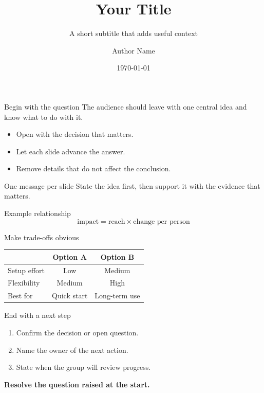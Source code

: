 \documentclass[aspectratio=169,12pt]{beamer}
\title{Your Title}
\subtitle{A short subtitle that adds useful context}
\author{Author Name}
\institute{Organization}
\date{\today}
\begin{document}
\begin{frame}[plain]
  \titlepage
\end{frame}

\begin{frame}[t]{Begin with the question}
  The audience should leave with one central idea and know what to do with it.

  \vspace{3mm}
  \begin{itemize}
    \item Open with the decision that matters.
    \item Let each slide advance the answer.
    \item Remove details that do not affect the conclusion.
  \end{itemize}
\end{frame}

\begin{frame}[t]{One message per slide}
  State the idea first, then support it with the evidence that matters.

  \vspace{4mm}
  \begin{block}{Example relationship}
    \[
      \text{impact} = \text{reach} \times \text{change per person}
    \]
  \end{block}
\end{frame}

\begin{frame}[t]{Make trade-offs obvious}
  \begin{table}
    \centering
    \begin{tabular}{@{}lcc@{}}
      \toprule
      & Option A & Option B \\
      \midrule
      Setup effort & Low & Medium \\
      Flexibility & Medium & High \\
      Best for & Quick start & Long-term use \\
      \bottomrule
    \end{tabular}
  \end{table}
\end{frame}

\begin{frame}[t]{End with a next step}
  \begin{enumerate}
    \item Confirm the decision or open question.
    \item Name the owner of the next action.
    \item State when the group will review progress.
  \end{enumerate}

  \vfill
  {\color{Accent}\bfseries Resolve the question raised at the start.}
\end{frame}
\end{document}
